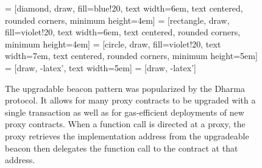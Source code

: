 \begin{figure}[!ht] 
    \centering
     = [diamond, draw, fill=blue!20, 
    text width=6em, text centered, rounded corners, minimum height=4em] 
     = [rectangle, draw, fill=violet!20, 
    text width=6em, text centered, rounded corners, minimum height=4em]
     = [circle, draw, fill=violet!20, 
        text width=7em, text centered, rounded corners, minimum height=5em]
     = [draw, -latex', text width=5em]
     = [draw, -latex']
    
    \caption{The upgradable beacon pattern was popularized by the Dharma protocol. It allows for many proxy contracts to be upgraded with a single
    transaction as well as for gas-efficient deployments of new proxy contracts. When a function call is directed at a proxy, the proxy retrieves the
    implementation address from the upgradeable beacon then delegates the function call to the contract at that address.}
    \label{fig:UpgradePattern}
\end{figure}